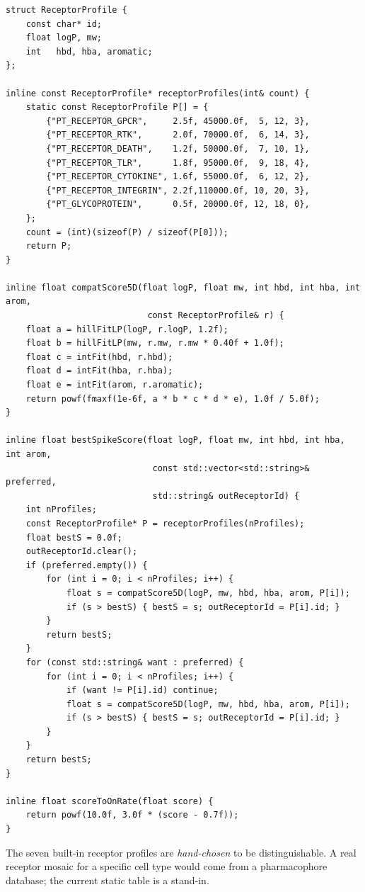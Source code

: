 \documentclass[11pt,letterpaper,twoside,openany]{book}
\begin{document}
\begin{lstlisting}
struct ReceptorProfile {
    const char* id;
    float logP, mw;
    int   hbd, hba, aromatic;
};

inline const ReceptorProfile* receptorProfiles(int& count) {
    static const ReceptorProfile P[] = {
        {"PT_RECEPTOR_GPCR",     2.5f, 45000.0f,  5, 12, 3},
        {"PT_RECEPTOR_RTK",      2.0f, 70000.0f,  6, 14, 3},
        {"PT_RECEPTOR_DEATH",    1.2f, 50000.0f,  7, 10, 1},
        {"PT_RECEPTOR_TLR",      1.8f, 95000.0f,  9, 18, 4},
        {"PT_RECEPTOR_CYTOKINE", 1.6f, 55000.0f,  6, 12, 2},
        {"PT_RECEPTOR_INTEGRIN", 2.2f,110000.0f, 10, 20, 3},
        {"PT_GLYCOPROTEIN",      0.5f, 20000.0f, 12, 18, 0},
    };
    count = (int)(sizeof(P) / sizeof(P[0]));
    return P;
}

inline float compatScore5D(float logP, float mw, int hbd, int hba, int arom,
                            const ReceptorProfile& r) {
    float a = hillFitLP(logP, r.logP, 1.2f);
    float b = hillFitLP(mw, r.mw, r.mw * 0.40f + 1.0f);
    float c = intFit(hbd, r.hbd);
    float d = intFit(hba, r.hba);
    float e = intFit(arom, r.aromatic);
    return powf(fmaxf(1e-6f, a * b * c * d * e), 1.0f / 5.0f);
}

inline float bestSpikeScore(float logP, float mw, int hbd, int hba, int arom,
                             const std::vector<std::string>& preferred,
                             std::string& outReceptorId) {
    int nProfiles;
    const ReceptorProfile* P = receptorProfiles(nProfiles);
    float bestS = 0.0f;
    outReceptorId.clear();
    if (preferred.empty()) {
        for (int i = 0; i < nProfiles; i++) {
            float s = compatScore5D(logP, mw, hbd, hba, arom, P[i]);
            if (s > bestS) { bestS = s; outReceptorId = P[i].id; }
        }
        return bestS;
    }
    for (const std::string& want : preferred) {
        for (int i = 0; i < nProfiles; i++) {
            if (want != P[i].id) continue;
            float s = compatScore5D(logP, mw, hbd, hba, arom, P[i]);
            if (s > bestS) { bestS = s; outReceptorId = P[i].id; }
        }
    }
    return bestS;
}

inline float scoreToOnRate(float score) {
    return powf(10.0f, 3.0f * (score - 0.7f));
}
\end{lstlisting}

The seven built-in receptor profiles are \emph{hand-chosen} to be
distinguishable. A real receptor mosaic for a specific cell type
would come from a pharmacophore database; the current static table
is a stand-in.
\end{document}
